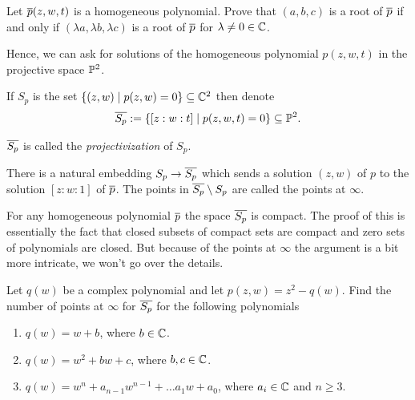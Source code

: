 \documentclass{article}
\begin{document}
\begin{qbox}
  Let $\overline{p}(z,w,t)$ is a homogeneous polynomial.
  Prove that $(a,b,c)$ is a root of $\overline{p}$ if and only if $(\lambda a , \lambda b, \lambda c)$ is a root of $\overline{p}$ for $\lambda \neq 0 \in \mathbb{C}$.
\end{qbox}

Hence, we can ask for solutions of the homogeneous polynomial  $p(z,w,t)$  in the projective space $\mathbb{P}^2$.

If $S_p$ is the set $\left\{(z,w) \mid  p(z,w) = 0\right\} \subseteq \mathbb{C}^2$ then denote
\begin{align*}
  \overline{S_p} := \left\{[z:w:t] \mid  p(z,w,t) = 0\right\} \subseteq \mathbb{P}^2.
\end{align*}
\begin{definition}
  $\overline{S_p}$ is called the \emph{projectivization} of $S_p$.
\end{definition}

There is a natural embedding $S_p \rightarrow \overline{S_p}$ which sends a solution $(z,w)$ of $p$ to the solution $[z:w:1]$ of $\overline{p}$.
The points in $\overline{S_p} \setminus S_p$ are called the points at $\infty$.



For any homogeneous polynomial $\overline{p}$ the space $\overline{S_p}$ is compact. The proof of this is essentially the fact that closed subsets of compact sets are compact and zero sets of polynomials are closed. But because of the points at $\infty$ the argument is a bit more intricate, we won't go over the details.


\begin{qbox}
  Let $q(w)$ be a complex polynomial and let $p(z,w) = z^2 - q(w)$.
  Find the number of points at $\infty$ for $\overline{S_p}$ for the following polynomials
    \begin{enumerate}
      \item $q(w) = w + b$, where $b \in \mathbb{C}$.
      \item $q(w) = w^2 + bw + c$, where $b,c \in \mathbb{C}$.
      \item $q(w) = w^n + a_{n-1} w^{n-1}+ \dots a_1 w + a_0$, where $a_i \in \mathbb{C}$ and $n \ge 3$.
    \end{enumerate}
\end{qbox}
\end{document}
